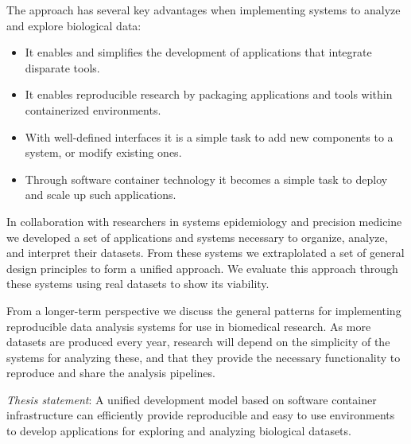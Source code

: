 The approach has several key advantages when implementing systems to analyze and
explore biological data:
\begin{itemize} 
    \item It enables and simplifies the development of applications that
        integrate disparate tools. 
        
    \item It enables reproducible research by packaging applications
        and tools within containerized environments. 

    \item With well-defined interfaces it is a simple task to add new components
        to a system, or modify existing ones. 
        
    \item Through software container technology it becomes a simple task to
        deploy and scale up such applications. 
\end{itemize} 

In collaboration with researchers in systems epidemiology and precision
medicine we developed a set of applications and systems necessary to organize,
analyze, and interpret their datasets. From these systems we extraplolated a set
of general design principles to form a unified approach. We evaluate this
approach through these systems using real datasets to show its viability. 

From a longer-term perspective we discuss the general patterns for implementing
reproducible data analysis systems for use in biomedical research. As more
datasets are produced every year, research will depend on the simplicity of the
systems for analyzing these, and that they provide the necessary functionality
to reproduce and share the analysis pipelines. 

\emph{Thesis statement}:
A unified development model based on software container infrastructure can
efficiently provide reproducible and easy to use environments to develop
applications for exploring and analyzing biological datasets. 

